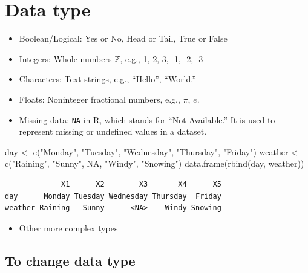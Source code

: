 \documentclass[
  letterpaper,
  DIV=11,
  numbers=noendperiod]{scrreprt}
\newenvironment{Shaded}{\begin{snugshade}}{\end{snugshade}}
\newcommand{\ConstantTok}[1]{\textcolor[rgb]{0.56,0.35,0.01}{#1}}
\newcommand{\FunctionTok}[1]{\textcolor[rgb]{0.28,0.35,0.67}{#1}}
\newcommand{\NormalTok}[1]{\textcolor[rgb]{0.00,0.23,0.31}{#1}}
\newcommand{\OtherTok}[1]{\textcolor[rgb]{0.00,0.23,0.31}{#1}}
\newcommand{\StringTok}[1]{\textcolor[rgb]{0.13,0.47,0.30}{#1}}
\providecommand{\tightlist}{%
  \setlength{\itemsep}{0pt}\setlength{\parskip}{0pt}}
\begin{document}
\section{Data type}\label{data-type}

\begin{itemize}
\item
  Boolean/Logical: Yes or No, Head or Tail, True or False
\item
  Integers: Whole numbers \(\mathbb{Z}\), e.g., 1, 2, 3, -1, -2, -3
\item
  Characters: Text strings, e.g., ``Hello'', ``World.''
\item
  Floats: Noninteger fractional numbers, e.g., \(\pi\), \(e\).
\item
  Missing data: \texttt{NA} in R, which stands for ``Not Available.'' It
  is used to represent missing or undefined values in a dataset.
\end{itemize}

\begin{Shaded}
\begin{Highlighting}[]
\NormalTok{day }\OtherTok{\textless{}{-}} \FunctionTok{c}\NormalTok{(}\StringTok{"Monday"}\NormalTok{, }\StringTok{"Tuesday"}\NormalTok{, }\StringTok{"Wednesday"}\NormalTok{, }\StringTok{"Thursday"}\NormalTok{, }\StringTok{"Friday"}\NormalTok{)}
\NormalTok{weather }\OtherTok{\textless{}{-}} \FunctionTok{c}\NormalTok{(}\StringTok{"Raining"}\NormalTok{, }\StringTok{"Sunny"}\NormalTok{, }\ConstantTok{NA}\NormalTok{, }\StringTok{"Windy"}\NormalTok{, }\StringTok{"Snowing"}\NormalTok{)}
\FunctionTok{data.frame}\NormalTok{(}\FunctionTok{rbind}\NormalTok{(day, weather))}
\end{Highlighting}
\end{Shaded}

\begin{verbatim}
             X1      X2        X3       X4      X5
day      Monday Tuesday Wednesday Thursday  Friday
weather Raining   Sunny      <NA>    Windy Snowing
\end{verbatim}

\begin{itemize}
\tightlist
\item
  Other more complex types
\end{itemize}

\subsection{To change data type}\label{to-change-data-type}
\end{document}
